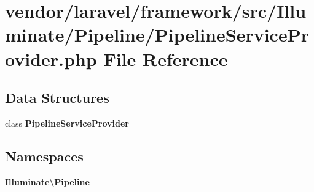 \section{vendor/laravel/framework/src/\+Illuminate/\+Pipeline/\+Pipeline\+Service\+Provider.php File Reference}
\label{_pipeline_service_provider_8php}
\subsection*{Data Structures}
\begin{DoxyCompactItemize}
\item 
class {\bf Pipeline\+Service\+Provider}
\end{DoxyCompactItemize}
\subsection*{Namespaces}
\begin{DoxyCompactItemize}
\item 
 {\bf Illuminate\textbackslash{}\+Pipeline}
\end{DoxyCompactItemize}
